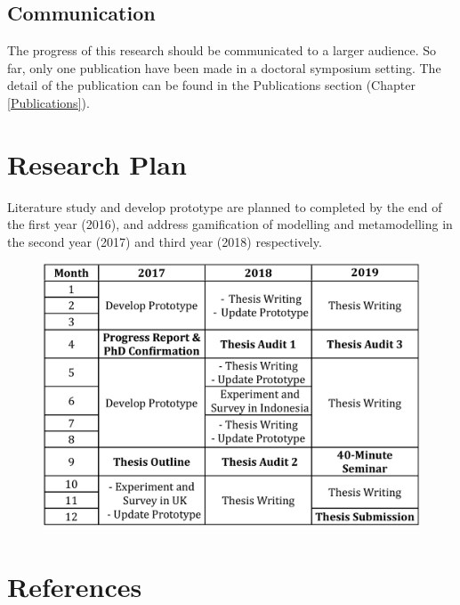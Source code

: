 \documentclass[12pt, a4paper]{report} \usepackage[titletoc]{appendix}
\begin{document}
\section{Communication}
The progress of this research should be communicated to a larger audience. So far, only one publication have been made in a doctoral symposium setting. The detail of the publication can be found in the Publications section (Chapter \ref{Publications}).

\chapter{Research Plan}
\label{Research Plan}
Literature study and develop prototype are planned to completed by the end of the first year (2016), and address gamification of modelling and metamodelling in the second year (2017) and third year (2018) respectively. 

\begin {table}[ht]
\caption {Research Timetable} 
\end{table}
\begin{figure}[ht]
\centering
\includegraphics[width=\textwidth]{timetable}
\end{figure}

\chapter{References}
\label{References}

\begingroup

\renewcommand{\chapter}[2]{}%

\endgroup
\end{document}
